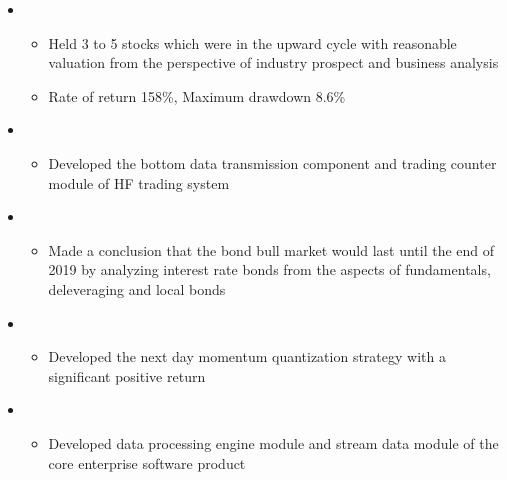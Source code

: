   \begin{itemize}[leftmargin=*]
    \item
      {\small
      \begin{itemize}
        \item Held 3 to 5 stocks which were in the upward cycle with reasonable valuation from the perspective of industry prospect and business analysis
        \item Rate of return 158\%, Maximum drawdown 8.6\%
      \end{itemize}
      }
    \item
      {\small
      \begin{itemize}
        \item Developed the bottom data transmission component and trading counter module of HF trading system
      \end{itemize}
      }
    \item
      {\small
      \begin{itemize}
        \item Made a conclusion that the bond bull market would last until the end of 2019 by analyzing interest rate bonds from the aspects of fundamentals, deleveraging and local bonds
      \end{itemize}
      }
    \item
      {\small
      \begin{itemize}
        \item Developed the next day momentum quantization strategy with a significant positive return
      \end{itemize}
      }
    \item
      {\small
      \begin{itemize}
        \item Developed data processing engine module and stream data module of the core enterprise software product
      \end{itemize}
      }
  \end{itemize}